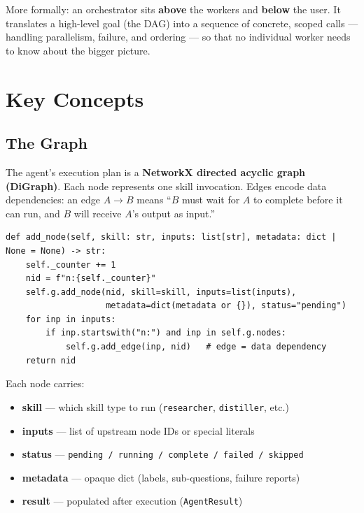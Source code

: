 \documentclass[12pt,a4paper]{article}
\begin{document}
More formally: an orchestrator sits \textbf{above} the workers and
\textbf{below} the user. It translates a high-level goal (the DAG) into a
sequence of concrete, scoped calls — handling parallelism, failure, and
ordering — so that no individual worker needs to know about the bigger picture.

\section{Key Concepts}

\subsection{The Graph}

The agent's execution plan is a \textbf{NetworkX directed acyclic graph (DiGraph)}.
Each node represents one skill invocation. Edges encode data dependencies:
an edge $A \rightarrow B$ means ``$B$ must wait for $A$ to complete before it
can run, and $B$ will receive $A$'s output as input.''

\begin{lstlisting}[style=pycode, caption={Graph node structure (flow.py)}]
def add_node(self, skill: str, inputs: list[str], metadata: dict | None = None) -> str:
    self._counter += 1
    nid = f"n:{self._counter}"
    self.g.add_node(nid, skill=skill, inputs=list(inputs),
                    metadata=dict(metadata or {}), status="pending")
    for inp in inputs:
        if inp.startswith("n:") and inp in self.g.nodes:
            self.g.add_edge(inp, nid)   # edge = data dependency
    return nid
\end{lstlisting}

Each node carries:
\begin{itemize}[noitemsep]
  \item \textbf{skill} — which skill type to run (\texttt{researcher}, \texttt{distiller}, etc.)
  \item \textbf{inputs} — list of upstream node IDs or special literals
  \item \textbf{status} — \texttt{pending / running / complete / failed / skipped}
  \item \textbf{metadata} — opaque dict (labels, sub-questions, failure reports)
  \item \textbf{result} — populated after execution (\texttt{AgentResult})
\end{itemize}
\end{document}

